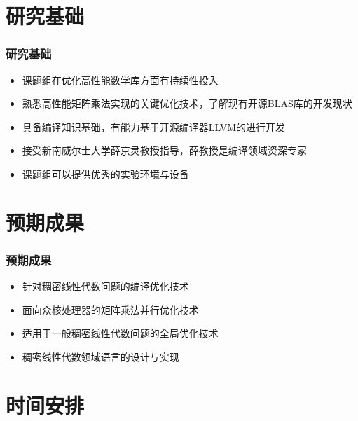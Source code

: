 \documentclass[aspectratio=169]{beamer}
\begin{document}
\section{研究基础}

\begin{frame}
  \frametitle{研究基础}
  \begin{itemize}
  \item 课题组在优化高性能数学库方面有持续性投入
  \item 熟悉高性能矩阵乘法实现的关键优化技术，了解现有开源BLAS库的开发现状
  \item 具备编译知识基础，有能力基于开源编译器LLVM的进行开发
  \item 接受新南威尔士大学薛京灵教授指导，薛教授是编译领域资深专家
  \item 课题组可以提供优秀的实验环境与设备
  \end{itemize}
\end{frame}

\section{预期成果}

\begin{frame}
  \frametitle{预期成果}
  \begin{itemize}
  \item 针对稠密线性代数问题的编译优化技术
  \item 面向众核处理器的矩阵乘法并行优化技术
  \item 适用于一般稠密线性代数问题的全局优化技术
  \item 稠密线性代数领域语言的设计与实现
  \end{itemize}
\end{frame}

\section{时间安排}
\end{document}
